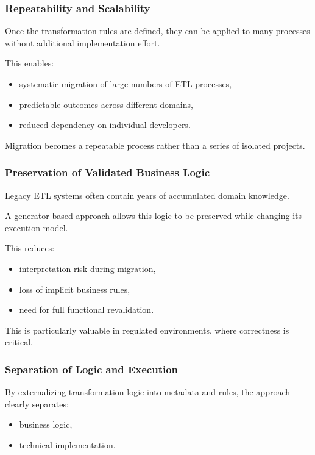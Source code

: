 \documentclass[11pt,a4paper]{article}
\begin{document}
\subsubsection{Repeatability and Scalability}

Once the transformation rules are defined, they can be applied to many processes without additional implementation effort.

This enables:
\begin{itemize}
  \item systematic migration of large numbers of ETL processes,
  \item predictable outcomes across different domains,
  \item reduced dependency on individual developers.
\end{itemize}

Migration becomes a repeatable process rather than a series of isolated projects.

\subsubsection{Preservation of Validated Business Logic}

Legacy ETL systems often contain years of accumulated domain knowledge.

A generator-based approach allows this logic to be preserved while changing its execution model.

This reduces:
\begin{itemize}
  \item interpretation risk during migration,
  \item loss of implicit business rules,
  \item need for full functional revalidation.
\end{itemize}

This is particularly valuable in regulated environments, where correctness is critical.

\subsubsection{Separation of Logic and Execution}

By externalizing transformation logic into metadata and rules, the approach clearly separates:
\begin{itemize}
  \item business logic,
  \item technical implementation.
\end{itemize}
\end{document}

